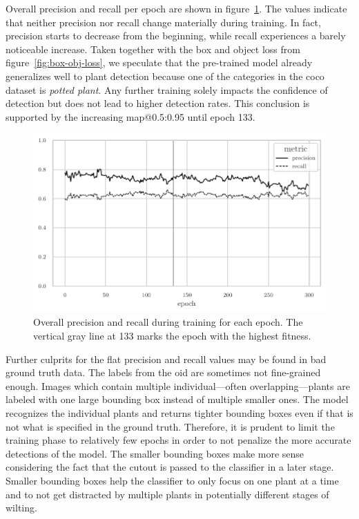 \documentclass[final]{vutinfth} %
\begin{document}
Overall precision and recall per epoch are shown in
figure~\ref{fig:prec-rec}. The values indicate that neither precision
nor recall change materially during training. In fact, precision
starts to decrease from the beginning, while recall experiences a
barely noticeable increase. Taken together with the box and object
loss from figure~\ref{fig:box-obj-loss}, we speculate that the
pre-trained model already generalizes well to plant detection because
one of the categories in the \gls{coco} \cite{lin2015} dataset is
\emph{potted plant}. Any further training solely impacts the
confidence of detection but does not lead to higher detection
rates. This conclusion is supported by the increasing
\gls{map}@0.5:0.95 until epoch \num{133}.

\begin{figure}
  \centering
  \includegraphics{graphics/precision_recall.pdf}
  \caption[Object detection precision and recall during
  training.]{Overall precision and recall during training for each
    epoch. The vertical gray line at 133 marks the epoch with the
    highest fitness.}
  \label{fig:prec-rec}
\end{figure}

Further culprits for the flat precision and recall values may be found
in bad ground truth data. The labels from the \gls{oid} are sometimes not
fine-grained enough. Images which contain multiple individual—often
overlapping—plants are labeled with one large bounding box instead of
multiple smaller ones. The model recognizes the individual plants and
returns tighter bounding boxes even if that is not what is specified
in the ground truth. Therefore, it is prudent to limit the training
phase to relatively few epochs in order to not penalize the more
accurate detections of the model. The smaller bounding boxes make more
sense considering the fact that the cutout is passed to the classifier
in a later stage. Smaller bounding boxes help the classifier to only
focus on one plant at a time and to not get distracted by multiple
plants in potentially different stages of wilting.
\end{document}
